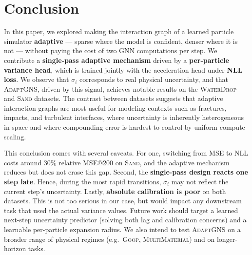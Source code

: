 \documentclass{article}
\begin{document}
\section{Conclusion}

In this paper, we explored making the interaction graph of a learned particle simulator \textbf{adaptive} — sparse where the model is confident, denser where it is not — without paying the cost of two GNN computations per step. We contribute a \textbf{single-pass adaptive mechanism} driven by a \textbf{per-particle variance head}, which is trained jointly with the acceleration head under \textbf{NLL loss}. We observe that $\sigma_i$ corresponds to real physical uncertainty, and that \textsc{AdaptGNS}, driven by this signal, achieves notable results on the \textsc{WaterDrop} and \textsc{Sand} datasets. The contrast between datasets suggests that adaptive interaction graphs are most useful for modeling contexts such as fractures, impacts, and turbulent interfaces, where uncertainty is inherently heterogeneous in space and where compounding error is hardest to control by uniform compute scaling.

This conclusion comes with several caveats. For one, switching from MSE to NLL costs around $30\%$ relative MSE@200 on \textsc{Sand}, and the adaptive mechanism reduces but does not erase this gap. Second, the \textbf{single-pass design reacts one step late}. Hence, during the most rapid transitions, $\sigma_i$ may not reflect the current step's uncertainty. Lastly, \textbf{absolute calibration is poor} on both datasets. This is not too serious in our case, but would impact any downstream task that used the actual variance values. Future work should target a learned next-step uncertainty predictor (solving both lag and calibration concerns) and a learnable per-particle expansion radius. We also intend to test \textsc{AdaptGNS} on a broader range of physical regimes (e.g.\ \textsc{Goop}, \textsc{MultiMaterial}) and on longer-horizon tasks. 

\newpage


\end{document}
